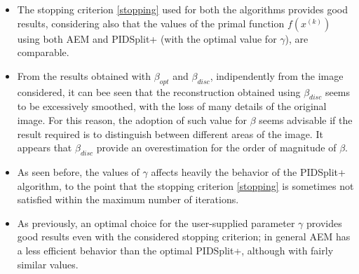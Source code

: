 \begin{itemize}
\item The stopping criterion \eqref{stopping} used for both the algorithms provides good results, considering also that the values of the primal function $f\left(x^{(k)}\right)$ using both AEM and PIDSplit+ (with the optimal value for $\gamma$), are comparable.

\item From the results obtained with $\beta_{opt}$ and $\beta_{disc}$, indipendently from the image considered, it can bee seen that the reconstruction obtained using $\beta_{disc}$ seems to be excessively smoothed, with the loss of many details of the original image. For this reason, the adoption of such value for $\beta$ seems advisable if the result required is to distinguish between different areas of the image. It appears that $\beta_{disc}$ provide an overestimation for the order of magnitude of $\beta$.

\item As seen before, the values of $\gamma$ affects heavily the behavior of the PIDSplit+ algorithm, to the point that the stopping criterion \eqref{stopping} is sometimes not satisfied within the maximum number of iterations.

\item As previously, an optimal choice for the user-supplied parameter $\gamma$ provides good results even with the considered stopping criterion; in general AEM has a less efficient behavior than the optimal PIDSplit+, although with fairly similar values.
\end{itemize} 